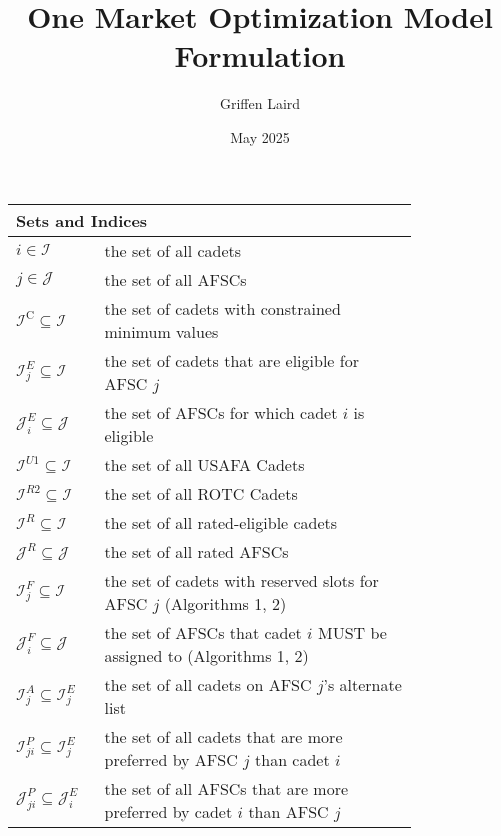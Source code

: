 \documentclass{article}
\title{One Market Optimization Model Formulation}
\author{Griffen Laird}
\date{May 2025}
\begin{document}
\maketitle


% 
\renewcommand{\arraystretch}{1.3}
\centering
\begin{tabular}{p{0.14\linewidth}p{0.66\linewidth}}  %
    \multicolumn{2}{l}{\textbf{Sets and Indices}}\\
    \hline
        $i \in \mathcal{I}$ & the set of all cadets \\
        $j \in \mathcal{J}$ & the set of all AFSCs \\
        $\mathcal{I}^{\text{C}} \subseteq \mathcal{I}$ & the set of cadets with constrained minimum values \\
        $\mathcal{I}^{E}_j \subseteq \mathcal{I}$ & the set of cadets that are eligible for AFSC $j$ \\
        $\mathcal{J}^{E}_i \subseteq \mathcal{J}$ & the set of AFSCs for which cadet $i$ is eligible \\
        $\mathcal{I}^{U1} \subseteq \mathcal{I}$ & the set of all USAFA Cadets\\
        $\mathcal{I}^{R2} \subseteq \mathcal{I}$ & the set of all ROTC Cadets\\
        $\mathcal{I}^R \subseteq \mathcal{I}$ & the set of all rated-eligible cadets \\
        $\mathcal{J}^R \subseteq \mathcal{J}$ & the set of all rated AFSCs \\
        $\mathcal{I}^{F}_j \subseteq \mathcal{I}$ & the set of cadets with reserved slots for AFSC $j$ (Algorithms 1, 2)\\
        $\mathcal{J}^{F}_i \subseteq \mathcal{J}$ & the set of AFSCs that cadet $i$ MUST be assigned to (Algorithms 1, 2)\\
        $\mathcal{I}^{A}_j \subseteq \mathcal{I}^E_j$ & the set of all cadets on AFSC $j$'s alternate list\\
        $\mathcal{I}^{P}_{ji} \subseteq \mathcal{I}^E_j$ & the set of all cadets that are more preferred by AFSC $j$ than cadet $i$\\
        $\mathcal{J}^{P}_{ji} \subseteq \mathcal{J}^E_i$ & the set of all AFSCs that are more preferred by cadet $i$ than AFSC $j$\\
    
\end{tabular}
\end{document}
